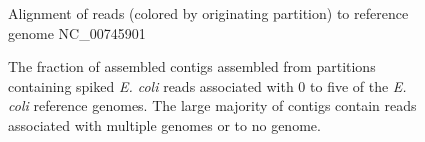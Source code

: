 \documentclass[11pt]{article} %
\begin{document}
\begin{figure}[ht]
\caption{Alignment of reads (colored by originating partition) to reference genome NC\_00745901}
\label{diginormreference}
\end{figure}

\begin{figure}[ht]
\caption{The fraction of assembled contigs assembled from partitions containing spiked \emph{E. coli} reads associated with 0 to five of the \emph{E. coli} reference genomes.  The large majority of contigs contain reads associated with multiple genomes or to no genome.}
\label{fractionassembled}
\end{figure}
\end{document}
